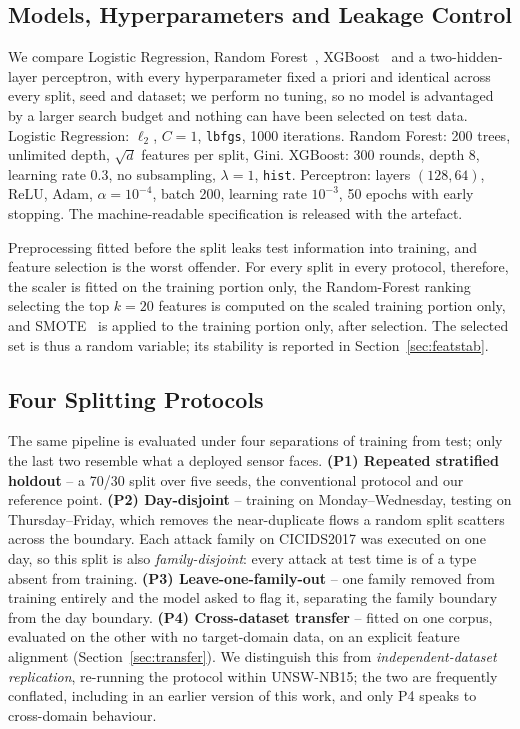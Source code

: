 \documentclass{llncs}
\begin{document}
\subsection{Models, Hyperparameters and Leakage Control}
\label{sec:leakage}
We compare Logistic Regression, Random Forest~\cite{breiman2001random},
XGBoost~\cite{chen2016xgboost} and a two-hidden-layer perceptron, with every
hyperparameter fixed a priori and identical across every split, seed and
dataset; we perform no tuning, so no model is advantaged by a larger search
budget and nothing can have been selected on test data. Logistic Regression:
$\ell_2$, $C=1$, \texttt{lbfgs}, 1000 iterations. Random Forest: 200 trees,
unlimited depth, $\sqrt{d}$ features per split, Gini. XGBoost: 300 rounds,
depth 8, learning rate 0.3, no subsampling, $\lambda=1$, \texttt{hist}.
Perceptron: layers $(128,64)$, ReLU, Adam, $\alpha=10^{-4}$, batch 200,
learning rate $10^{-3}$, 50 epochs with early stopping. The machine-readable
specification is released with the artefact.

Preprocessing fitted before the split leaks test information into training,
and feature selection is the worst offender. For every split in every
protocol, therefore, the scaler is fitted on the training portion only, the
Random-Forest ranking selecting the top $k=20$ features is computed on the
scaled training portion only, and SMOTE~\cite{chawla2002smote} is applied to
the training portion only, after selection. The selected set is thus a random
variable; its stability is reported in Section~\ref{sec:featstab}.

\subsection{Four Splitting Protocols}
The same pipeline is evaluated under four separations of training from test;
only the last two resemble what a deployed sensor faces.
\textbf{(P1) Repeated stratified holdout} -- a 70/30 split over five seeds,
the conventional protocol and our reference point.
\textbf{(P2) Day-disjoint} -- training on Monday--Wednesday, testing on
Thursday--Friday, which removes the near-duplicate flows a random split
scatters across the boundary. Each attack family on CICIDS2017 was executed
on one day, so this split is also \emph{family-disjoint}: every attack at
test time is of a type absent from training.
\textbf{(P3) Leave-one-family-out} -- one family removed from training
entirely and the model asked to flag it, separating the family boundary from
the day boundary.
\textbf{(P4) Cross-dataset transfer} -- fitted on one corpus, evaluated on
the other with no target-domain data, on an explicit feature alignment
(Section~\ref{sec:transfer}). We distinguish this from
\emph{independent-dataset replication}, re-running the protocol within
UNSW-NB15; the two are frequently conflated, including in an earlier version
of this work, and only P4 speaks to cross-domain behaviour.
\end{document}
